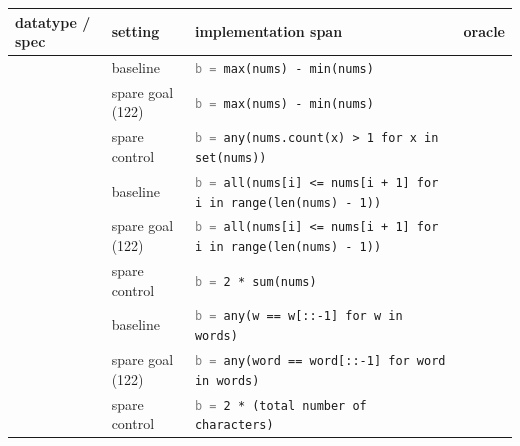 \begin{table}[p]\centering\footnotesize\setlength{\tabcolsep}{4pt}
\begin{tabular}{l l p{7cm} c}
\toprule
datatype / spec & setting & implementation span & oracle \\
\midrule
{} & baseline & \texttt{\textcolor{gray}{b =} max(nums) - min(nums)} & \textcolor{ForestGreen}{} \\
 & spare goal (122) & \texttt{\textcolor{gray}{b =} max(nums) - min(nums)} & \textcolor{ForestGreen}{} \\
 & spare control & \texttt{\textcolor{gray}{b =} any(nums.count(x) \textgreater{} 1 for x in set(nums))} & \textcolor{BrickRed}{} \\
\midrule
{} & baseline & \texttt{\textcolor{gray}{b =} all(nums[i] \textless{}= nums[i + 1] for i in range(len(nums) - 1))} & \textcolor{ForestGreen}{} \\
 & spare goal (122) & \texttt{\textcolor{gray}{b =} all(nums[i] \textless{}= nums[i + 1] for i in range(len(nums) - 1))} & \textcolor{ForestGreen}{} \\
 & spare control & \texttt{\textcolor{gray}{b =} 2 * sum(nums)} & \textcolor{BrickRed}{} \\
\midrule
{} & baseline & \texttt{\textcolor{gray}{b =} any(w == w[::-1] for w in words)} & \textcolor{ForestGreen}{} \\
 & spare goal (122) & \texttt{\textcolor{gray}{b =} any(word == word[::-1] for word in words)} & \textcolor{ForestGreen}{} \\
 & spare control & \texttt{\textcolor{gray}{b =} 2 * (total number of characters)} & \textcolor{BrickRed}{} \\

\end{tabular}
\end{table}
